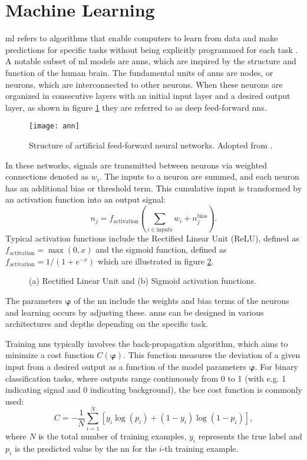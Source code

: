 \section{Machine Learning}\ac{ml} refers to algorithms that enable computers to learn from data and make predictions for specific tasks without being explicitly programmed for each task \citep{kubat2021introduction}. A notable subset of \ac{ml} models are \acp{ann}, which are inspired by the structure and function of the human brain. The fundamental units of \acp{ann} are nodes, or neurons, which are interconnected to other neurons. When these neurons are organized in consecutive layers with an initial input layer and a desired output layer, as shown in figure \ref{fig:ann} they are referred to as deep feed-forward \acp{nn}.
\begin{figure}
    \centering
    \texttt{[image: ann]}
    \caption[]{Structure of artificial feed-forward neural networks. Adopted from \citep{8114708}.}
    \label{fig:ann}
\end{figure}
In these networks, signals are transmitted between neurons via weighted connections denoted as $w_i$. The inputs to a neuron are summed, and each neuron has an additional bias or threshold term. This cumulative input is transformed by an activation function into an output signal:
\begin{equation}
    n_j=f_\text{activation} \left( \sum_{i\in \text{inputs}} w_i + n_j^\text{bias}\right).
\end{equation}
Typical activation functions include the Rectified Linear Unit (ReLU), defined as $f_\text{activation}=\max(0,x)$ and the sigmoid function, defined as  $f_\text{activation}=1/(1+e^{-x})$ which are illustrated in figure \ref{fig:activation_fun}.
\begin{figure}
    \centering
    \caption[]{(a) Rectified Linear Unit and (b) Sigmoid activation functions.}
    \label{fig:activation_fun}
\end{figure}
The parameters $\bm{\varphi}$ of the \ac{nn} include the weights and bias terms of the neurons and learning occurs by adjusting these. \acp{ann} can be designed in various architectures and depths depending on the specific task.

Training \acp{nn} typically involves the back-propagation algorithm, which aims to minimize a cost  function $C(\bm{\varphi})$. This function measures the deviation of a given input from a desired output as a function of the model parameters $\bm{\varphi}$. For binary classification tasks, where outputs range continuously from 0 to 1 (with e.g. 1 indicating signal and 0 indicating background), the \ac{bce} cost function is commonly used:
\begin{equation}\label{eq:bce}
    C = -\frac{1}{N} \sum_{i=1}^{N} \left[ y_i \log(p_i) + (1 - y_i) \log(1 - p_i) \right],
\end{equation}
where $N$ is the total number of training examples, $y_i$ represents the true label and $p_i$ is the predicted value by the \ac{nn} for the $i$-th training example.

